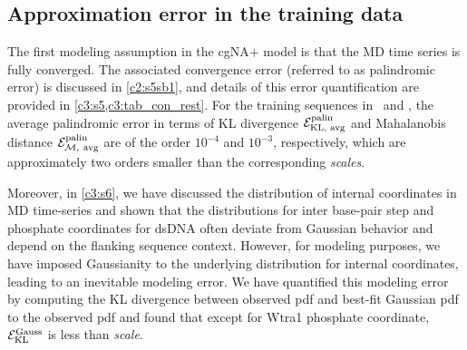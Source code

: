 \subsection{Approximation error in the training data}\label{c6:converge_error_sec}
The first modeling assumption in the cgNA$+$ model is that the MD time series is fully converged.  
The associated convergence error (referred to as palindromic error) is discussed in \cref{c2:s5sb1}, and details of this error quantification are provided in \cref{c3:s5,c3:tab_con_rest}. 
For the training sequences in \Lbh \ and \Lbm, the average palindromic error in terms of KL divergence ${\mathcal E}_{\text{KL, avg}}^{\text{palin}}$ and Mahalanobis distance ${\mathcal E}_{\mathcal{M}, \ \text{avg}}^{\text{palin}}$ are of the order $10^{-4}$ and $10^{-3}$, respectively, which are approximately two orders smaller than the corresponding \textit{scales}. 



Moreover, in \cref{c3:s6}, we have discussed the distribution of internal coordinates in MD time-series and shown that the distributions for inter base-pair step and phosphate coordinates for dsDNA often deviate from Gaussian behavior and depend on the flanking sequence context.
However, for modeling purposes, we have imposed Gaussianity to the underlying distribution for internal coordinates, leading to an inevitable modeling error. 
We have quantified this modeling error by computing the KL divergence between observed pdf and best-fit Gaussian pdf to the observed pdf and found that except for Wtra1 phosphate coordinate, ${\mathcal E}_{\text{KL}}^{\text{Gauss}}$ is less than \textit{scale}. \clearpage

